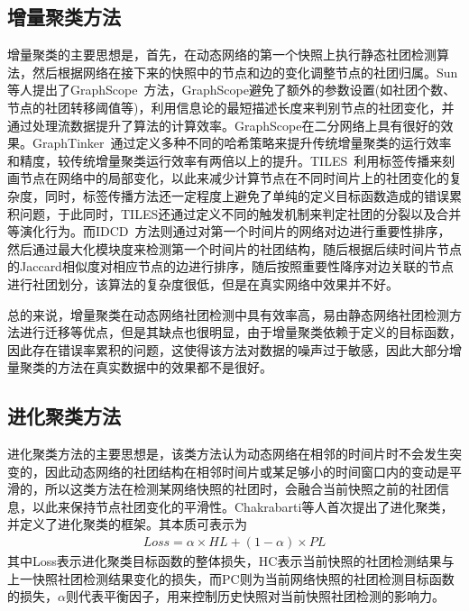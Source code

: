 \subsection{增量聚类方法}
增量聚类的主要思想是，首先，在动态网络的第一个快照上执行静态社团检测算法，然后根据网络在接下来的快照中的节点和边的变化调整节点的社团归属。Sun等人提出了GraphScope~\cite{sun2007graphscope}方法，GraphScope避免了额外的参数设置(如社团个数、节点的社团转移阈值等)，利用信息论的最短描述长度来判别节点的社团变化，并通过处理流数据提升了算法的计算效率。GraphScope在二分网络上具有很好的效果。GraphTinker~\cite{jaiyeoba2019graphtinker}通过定义多种不同的哈希策略来提升传统增量聚类的运行效率和精度，较传统增量聚类运行效率有两倍以上的提升。TILES~\cite{rossetti2017tiles}利用标签传播来刻画节点在网络中的局部变化，以此来减少计算节点在不同时间片上的社团变化的复杂度，同时，标签传播方法还一定程度上避免了单纯的定义目标函数造成的错误累积问题，于此同时，TILES还通过定义不同的触发机制来判定社团的分裂以及合并等演化行为。而IDCD~\cite{lyf2015}方法则通过对第一个时间片的网络对边进行重要性排序，然后通过最大化模块度来检测第一个时间片的社团结构，随后根据后续时间片节点的Jaccard相似度对相应节点的边进行排序，随后按照重要性降序对边关联的节点进行社团划分，该算法的复杂度很低，但是在真实网络中效果并不好。

总的来说，增量聚类在动态网络社团检测中具有效率高，易由静态网络社团检测方法进行迁移等优点，但是其缺点也很明显，由于增量聚类依赖于定义的目标函数，因此存在错误率累积的问题，这使得该方法对数据的噪声过于敏感，因此大部分增量聚类的方法在真实数据中的效果都不是很好。

\subsection{进化聚类方法}

进化聚类方法的主要思想是，该类方法认为动态网络在相邻的时间片时不会发生突变的，因此动态网络的社团结构在相邻时间片或某足够小的时间窗口内的变动是平滑的，所以这类方法在检测某网络快照的社团时，会融合当前快照之前的社团信息，以此来保持节点社团变化的平滑性。Chakrabarti等人首次提出了进化聚类\cite{chakrabarti2006evolutionary}，并定义了进化聚类的框架。其本质可表示为
\begin{equation}
	\begin{split}
		Loss = \alpha \times HL + (1-\alpha) \times PL
	\end{split}
\end{equation}
其中Loss表示进化聚类目标函数的整体损失，HC表示当前快照的社团检测结果与上一快照社团检测结果变化的损失，而PC则为当前网络快照的社团检测目标函数的损失，$\alpha$则代表平衡因子，用来控制历史快照对当前快照社团检测的影响力。

